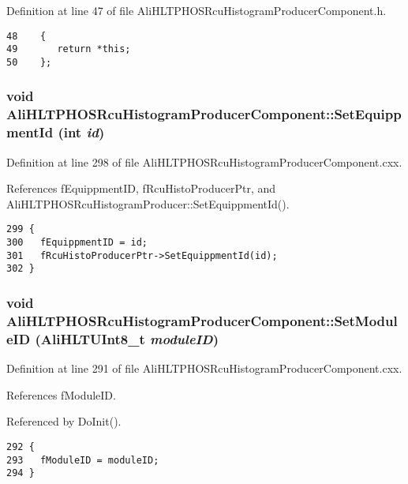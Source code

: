 Definition at line 47 of file Ali\-HLTPHOSRcu\-Histogram\-Producer\-Component.h.

\footnotesize\begin{verbatim}48    {
49       return *this;
50    };
\end{verbatim}\normalsize 


\subsubsection{\setlength{\rightskip}{0pt plus 5cm}void Ali\-HLTPHOSRcu\-Histogram\-Producer\-Component::Set\-Equippment\-Id (int {\em id})}\label{classAliHLTPHOSRcuHistogramProducerComponent_a15}




Definition at line 298 of file Ali\-HLTPHOSRcu\-Histogram\-Producer\-Component.cxx.

References f\-Equippment\-ID, f\-Rcu\-Histo\-Producer\-Ptr, and Ali\-HLTPHOSRcu\-Histogram\-Producer::Set\-Equippment\-Id().

\footnotesize\begin{verbatim}299 {
300   fEquippmentID = id;
301   fRcuHistoProducerPtr->SetEquippmentId(id);
302 }
\end{verbatim}\normalsize 


\subsubsection{\setlength{\rightskip}{0pt plus 5cm}void Ali\-HLTPHOSRcu\-Histogram\-Producer\-Component::Set\-Module\-ID ({\bf Ali\-HLTUInt8\_\-t} {\em module\-ID})}\label{classAliHLTPHOSRcuHistogramProducerComponent_a14}




Definition at line 291 of file Ali\-HLTPHOSRcu\-Histogram\-Producer\-Component.cxx.

References f\-Module\-ID.

Referenced by Do\-Init().

\footnotesize\begin{verbatim}292 {
293   fModuleID = moduleID;
294 }
\end{verbatim}\normalsize 


